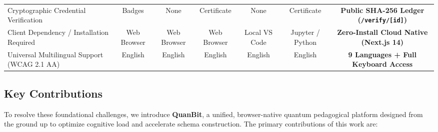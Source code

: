 \documentclass[conference]{IEEEtran}
\begin{document}
\begin{table}[t]
{\begin{tabular}{@{}lcccccc@{}}
Cryptographic Credential Verification & Badges & None & Certificate & None & Certificate & \textbf{Public SHA-256 Ledger (\texttt{/verify/[id]})} \\
Client Dependency / Installation Required & Web Browser & Web Browser & Web Browser & Local VS Code & Jupyter / Python & \textbf{Zero-Install Cloud Native (Next.js 14)} \\
Universal Multilingual Support (WCAG 2.1 AA) & English & English & English & English & English & \textbf{9 Languages + Full Keyboard Access} \\
\bottomrule
\end{tabular}%
}
\end{table}

\subsection{Key Contributions}
To resolve these foundational challenges, we introduce \textbf{QuanBit}, a unified, browser-native quantum pedagogical platform designed from the ground up to optimize cognitive load and accelerate schema construction. The primary contributions of this work are:
\end{document}
